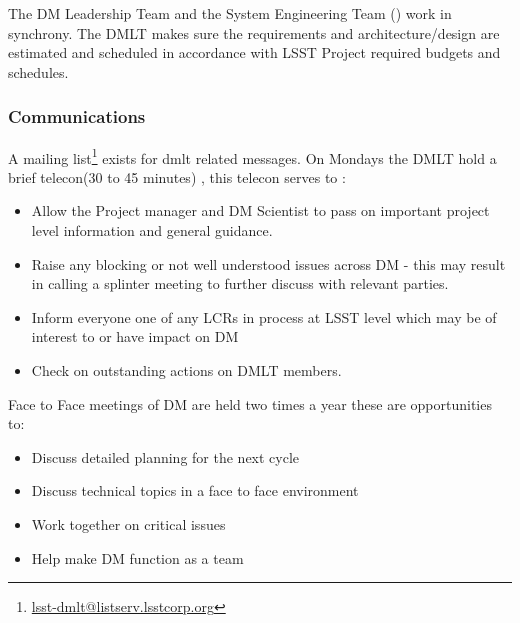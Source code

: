 The DM Leadership Team and the System Engineering Team () work in synchrony. 
The DMLT makes sure the requirements and architecture/design are estimated and scheduled in accordance with LSST Project required budgets and schedules.

 \subsubsection{Communications} 
 A mailing list\footnote{\url{lsst-dmlt@listserv.lsstcorp.org}} exists for dmlt related messages. 
 On Mondays the DMLT hold a brief telecon(30 to 45 minutes) , this telecon serves to :
\begin{itemize}
\item Allow the Project manager and DM Scientist  to pass on important project level information and general guidance. 
\item Raise any blocking or not well understood issues across DM - this may result in calling a splinter meeting to further discuss with relevant parties.
\item Inform everyone one of any LCRs in process at LSST level which may be of interest to or  have impact on DM
\item Check on outstanding actions on DMLT members. 
\end{itemize}

Face to Face meetings of DM are held two times a year these are opportunities to:
\begin{itemize}
\item Discuss detailed planning for the next cycle
\item Discuss technical topics in a face to face environment
\item Work together on critical issues
\item Help make DM function as a team
\end{itemize}


